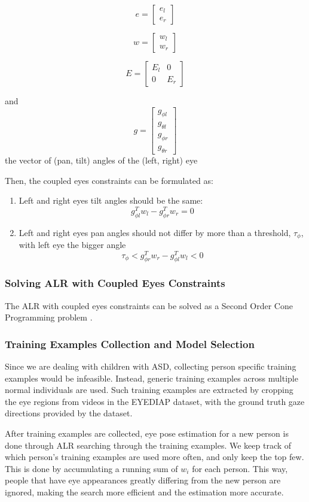 \[  e = \begin{bmatrix}
e_l \\ e_r
\end{bmatrix}   \]

\[  w = \begin{bmatrix}
w_l \\ w_r
\end{bmatrix}   \]

\[  E = \begin{bmatrix}
E_l	&	0 \\
0	&	E_r
\end{bmatrix}  \]

and \[g = \begin{bmatrix}
g_{\phi l} \\ g_{\theta l} \\ g_{\phi r} \\ g_{\theta r}
\end{bmatrix}  \]
the vector of (pan, tilt) angles of the (left, right) eye

Then, the coupled eyes constraints can be formulated as: 
\begin{enumerate}
	\item Left and right eyes tilt angles should be the same:
	\[ g_{\phi l}^T w_l -  g_{\phi r}^T w_r = 0 \]
	
	\item Left and right eyes pan angles should not differ by more than a threshold, \(\tau_\phi\), with left eye the bigger angle
	\[  \tau_\phi < g_{\phi r}^T w_r - g_{\phi l}^T w_l < 0 \]
\end{enumerate}


\subsubsection{Solving ALR with Coupled Eyes Constraints}
The ALR with coupled eyes constraints can be solved as a Second Order Cone Programming problem \cite{funes2013person, kim2001second}.


\subsubsection{Training Examples Collection and Model Selection}
Since we are dealing with children with ASD, collecting person specific training examples would be infeasible.  Instead, generic training examples across multiple normal individuals are used.  Such training examples are extracted by cropping the eye regions from videos in the EYEDIAP dataset, with the ground truth gaze directions provided by the dataset.

After training examples are collected, eye pose estimation for a new person is done through ALR searching through the training examples.  We keep track of which person's training examples are used more often, and only keep the top few.  This is done by accumulating a running sum of \(w_i\) for each person.  This way, people that have eye appearances greatly differing from the new person are ignored, making the search more efficient and the estimation more accurate.